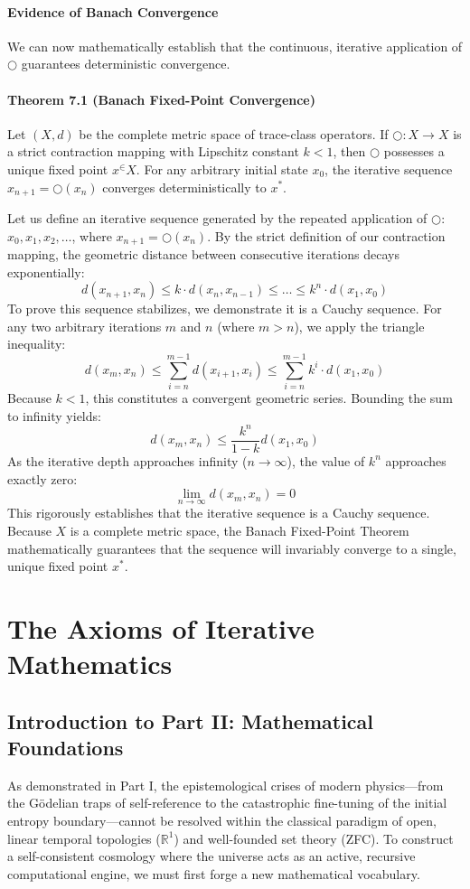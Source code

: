 \documentclass[12pt,openany]{book}
\theoremstyle{plain}
\theoremstyle{definition}
\theoremstyle{remark}
\begin{document}
\subsection{Evidence of Banach Convergence} We can now mathematically establish that the continuous, iterative application of $\bigcirc$ guarantees deterministic convergence.

\subsection{Theorem 7.1 (Banach Fixed-Point Convergence)}  
Let $(X, d)$ be the complete metric space of trace-class operators. If $\bigcirc: X \to X$ is a strict contraction mapping with Lipschitz constant $k < 1$, then $\bigcirc$ possesses a unique fixed point $x^ \in X$. For any arbitrary initial state $x_0$, the iterative sequence $x_{n+1} = \bigcirc(x_n)$ converges deterministically to $x^*$.

Let us define an iterative sequence generated by the repeated application of $\bigcirc$: $x_0, x_1, x_2, \dots$, where $x_{n+1} = \bigcirc(x_n)$. By the strict definition of our contraction mapping, the geometric distance between consecutive iterations decays exponentially:
$$d(x_{n+1}, x_n) \le k \cdot d(x_n, x_{n-1}) \le \dots \le k^n \cdot d(x_1, x_0)$$To prove this sequence stabilizes, we demonstrate it is a Cauchy sequence. For any two arbitrary iterations $m$ and $n$ (where $m > n$), we apply the triangle inequality:$$d(x_m, x_n) \le \sum_{i=n}^{m-1} d(x_{i+1}, x_i) \le \sum_{i=n}^{m-1} k^i \cdot d(x_1, x_0)$$Because $k < 1$, this constitutes a convergent geometric series. Bounding the sum to infinity yields:$$d(x_m, x_n) \le \frac{k^n}{1-k} d(x_1, x_0)$$As the iterative depth approaches infinity ($n \to \infty$), the value of $k^n$ approaches exactly zero:
$$\lim_{n \to \infty} d(x_m, x_n) = 0$$This rigorously establishes that the iterative sequence is a Cauchy sequence. Because $X$ is a complete metric space, the Banach Fixed-Point Theorem mathematically guarantees that the sequence will invariably converge to a single, unique fixed point $x^*$.

\part{The Axioms of Iterative Mathematics}

\chapter{Introduction to Part II: Mathematical Foundations}
As demonstrated in Part I, the epistemological crises of modern physics—from the Gödelian traps of self-reference to the catastrophic fine-tuning of the initial entropy boundary—cannot be resolved within the classical paradigm of open, linear temporal topologies ($\mathbb{R}^1$) and well-founded set theory (ZFC). To construct a self-consistent cosmology where the universe acts as an active, recursive computational engine, we must first forge a new mathematical vocabulary.
\end{document}
